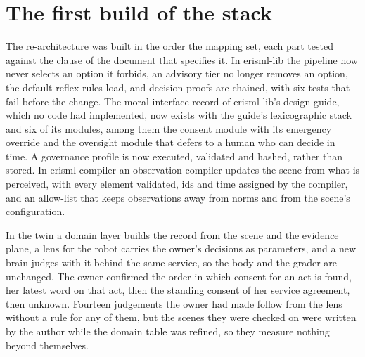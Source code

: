 \section{The first build of the stack}\label{sec:log-stack1}

The re-architecture was built in the order the mapping set, each part tested against the clause of
the document that specifies it.
In erisml-lib the pipeline now never selects an option it forbids, an advisory tier no longer removes
an option, the default reflex rules load, and decision proofs are chained, with six tests that fail
before the change.
The moral interface record of erisml-lib's design guide, which no code had implemented, now exists
with the guide's lexicographic stack and six of its modules, among them the consent module with its
emergency override and the oversight module that defers to a human who can decide in time.
A governance profile is now executed, validated and hashed, rather than stored.
In erisml-compiler an observation compiler updates the scene from what is perceived, with every
element validated, ids and time assigned by the compiler, and an allow-list that keeps observations
away from norms and from the scene's configuration.

In the twin a domain layer builds the record from the scene and the evidence plane, a lens for the
robot carries the owner's decisions as parameters, and a new brain judges with it behind the same
service, so the body and the grader are unchanged.
The owner confirmed the order in which consent for an act is found, her latest word on that act,
then the standing consent of her service agreement, then unknown.
Fourteen judgements the owner had made follow from the lens without a rule for any of them, but the
scenes they were checked on were written by the author while the domain table was refined, so they
measure nothing beyond themselves.

